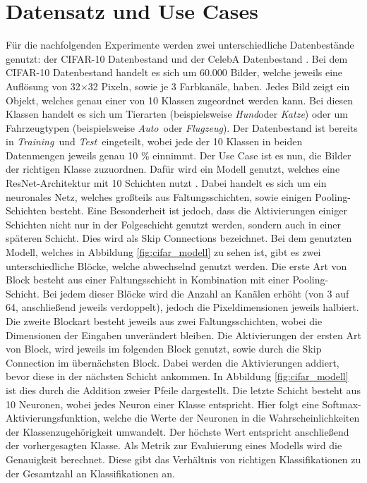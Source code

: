 \section{Datensatz und Use Cases}\label{sec:use_case}

Für die nachfolgenden Experimente werden zwei unterschiedliche Datenbestände genutzt: der CIFAR-10 Datenbestand \cite{cifar10} und der CelebA Datenbestand \cite{celeba}.
Bei dem CIFAR-10 Datenbestand handelt es sich um 60.000 Bilder, welche jeweils eine Auflösung von 32$\times$32 Pixeln, sowie je 3 Farbkanäle, haben.
Jedes Bild zeigt ein Objekt, welches genau einer von 10 Klassen zugeordnet werden kann. 
Bei diesen Klassen handelt es sich um Tierarten (beispielsweise \dq \textit{Hund}\dq oder \dq \textit{Katze}\dq) oder um Fahrzeugtypen (beispielsweise \dq \textit{Auto}\dq\ oder \dq \textit{Flugzeug}\dq).
Der Datenbestand ist bereits in \dq \textit{Training}\dq\ und \dq \textit{Test}\dq\ eingeteilt, wobei jede der 10 Klassen in beiden Datenmengen jeweils genau 10 \% einnimmt.
Der Use Case ist es nun, die Bilder der richtigen Klasse zuzuordnen.
Dafür wird ein Modell genutzt, welches eine ResNet-Architektur mit 10 Schichten nutzt \cite{resnet}.
Dabei handelt es sich um ein neuronales Netz, welches großteils aus Faltungsschichten, sowie einigen Pooling-Schichten besteht.
Eine Besonderheit ist jedoch, dass die Aktivierungen einiger Schichten nicht nur in der Folgeschicht genutzt werden, sondern auch in einer späteren Schicht. 
Dies wird als Skip Connections bezeichnet.
Bei dem genutzten Modell, welches in Abbildung \ref{fig:cifar_modell} zu sehen ist, gibt es zwei unterschiedliche Blöcke, welche abwechselnd genutzt werden. 
Die erste Art von Block besteht aus einer Faltungsschicht in Kombination mit einer Pooling-Schicht. 
Bei jedem dieser Blöcke wird die Anzahl an Kanälen erhöht (von 3 auf 64, anschließend jeweils verdoppelt), jedoch die Pixeldimensionen jeweils halbiert.
Die zweite Blockart besteht jeweils aus zwei Faltungsschichten, wobei die Dimensionen der Eingaben unverändert bleiben.
Die Aktivierungen der ersten Art von Block, wird jeweils im folgenden Block genutzt, sowie durch die Skip Connection im übernächsten Block. 
Dabei werden die Aktivierungen addiert, bevor diese in der nächsten Schicht ankommen.
In Abbildung \ref{fig:cifar_modell} ist dies durch die Addition zweier Pfeile dargestellt.
Die letzte Schicht besteht aus 10 Neuronen, wobei jedes Neuron einer Klasse entspricht.
Hier folgt eine Softmax-Aktivierungsfunktion, welche die Werte der Neuronen in die Wahrscheinlichkeiten der Klassenzugehörigkeit umwandelt.
Der höchste Wert entspricht anschließend der vorhergesagten Klasse.
Als Metrik zur Evaluierung eines Modells wird die Genauigkeit berechnet. 
Diese gibt das Verhältnis von richtigen Klassifikationen zu der Gesamtzahl an Klassifikationen an.

